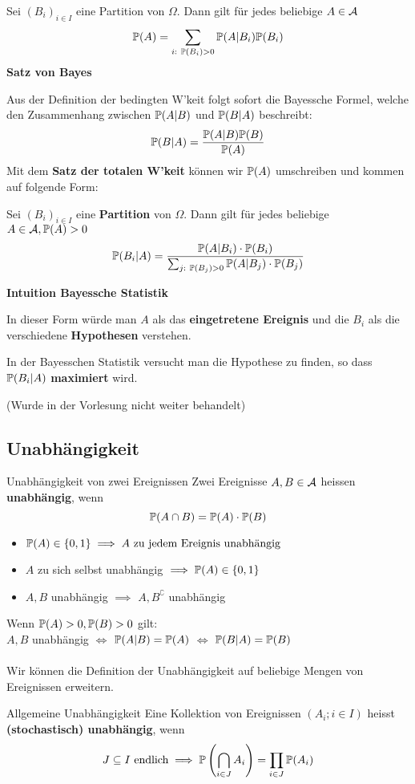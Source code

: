Sei $(B_i)_{i\in I}$ eine Partition von $\Omega$. Dann gilt für jedes beliebige $A \in \A$
$$\P(A) = \sum_{i:\ \P(B_i)>0} \P(A|B_i)\P(B_i)$$
\textbf{Satz von Bayes}

Aus der Definition der bedingten W'keit folgt sofort die Bayessche Formel, welche den Zusammenhang zwischen $\P(A|B)$ und $\P(B|A)$ beschreibt:
$$\P(B|A) = \frac{\P(A|B)\P(B)}{\P(A)}$$
Mit dem \textbf{Satz der totalen W'keit} können wir $\P(A)$ umschreiben und kommen auf folgende Form:

Sei $(B_i)_{i\in I}$ eine \textbf{Partition} von $\Omega$. Dann gilt für jedes beliebige $A \in \A, \P(A) > 0$
$$\P(B_i|A) = \frac{\P(A|B_i)\cdot\P(B_i)}{\sum_{j:\ \P(B_j)>0}\P(A|B_j)\cdot \P(B_j)}$$

\textbf{Intuition Bayessche Statistik}

In dieser Form würde man $A$ als das \textbf{eingetretene Ereignis} und die $B_i$ als die verschiedene \textbf{Hypothesen} verstehen. 

In der Bayesschen Statistik versucht man die Hypothese zu finden, so dass $\P(B_i|A)$ \textbf{maximiert} wird.

(Wurde in der Vorlesung nicht weiter behandelt)
\subsection{Unabhängigkeit} 
\begin{mainbox}{Unabhängigkeit von zwei Ereignissen}
    Zwei Ereignisse $A, B \in \A$ heissen \textbf{unabhängig}, wenn 
    $$\P(A\cap B) = \P(A) \cdot \P(B)$$
\end{mainbox}
\begin{itemize}
    \item $\P(A) \in \{0, 1\} \implies A \text{ zu jedem Ereignis unabhängig}$
    \item $A$ zu sich selbst unabhängig $\implies \P(A) \in \{0,1\}$
    \item $A, B$ unabhängig $\implies$ $A, B^\complement$ unabhängig
\end{itemize}
Wenn $\P(A) > 0, \P(B) > 0$ gilt:\\
 $A,B$ unabhängig $\iff$ $\P(A|B)=\P(A)$ $\iff$ $\P(B|A)=\P(B)$
\\
\\
Wir können die Definition der Unabhängigkeit auf beliebige Mengen von Ereignissen erweitern.
\begin{mainbox}{Allgemeine Unabhängigkeit}
    Eine Kollektion von Ereignissen $(A_i; i \in I)$ heisst \textbf{(stochastisch) unabhängig}, wenn 
    $$J \subseteq I \text{ endlich} \implies \P\left(\bigcap_{i\in J} A_i\right) = \prod_{i \in J} \P(A_i)$$
\end{mainbox}

